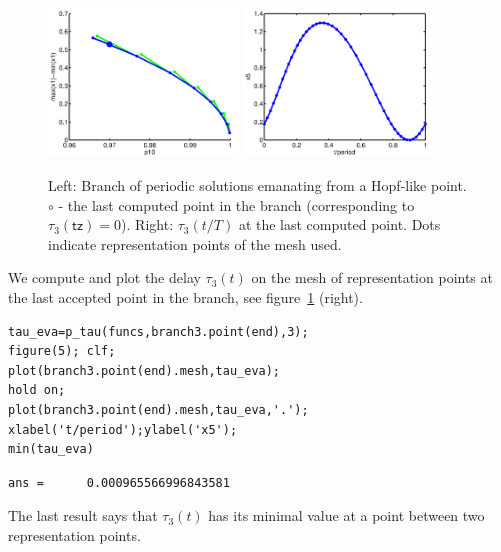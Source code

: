 \documentclass[10pt]{scrartcl}
\newcommand{\parm}[1]{\mathsf{#1}}
\begin{document}
\begin{figure}[h]
  \begin{center}
    \includegraphics[width=0.45\textwidth]{fig/sdd4}
    \includegraphics[width=0.45\textwidth]{fig/sdd5}
  \end{center}
  \caption{\label{br_ps_sd1}Left: Branch of periodic solutions emanating
    from a Hopf-like point. $\circ$ - the last computed point in the branch
    (corresponding to $\tau_3(\parm{tz})=0$). Right: $\tau_3(t/T)$ at 
    the last computed point. Dots indicate representation points
    of the mesh used.}
\end{figure}
We compute and plot the delay $\tau_3(t)$ on the mesh of representation points
at the last accepted point in the
branch, see figure~\ref{br_ps_sd1} (right).
\begin{lstlisting}
tau_eva=p_tau(funcs,branch3.point(end),3);
figure(5); clf;
plot(branch3.point(end).mesh,tau_eva);
hold on;
plot(branch3.point(end).mesh,tau_eva,'.');
xlabel('t/period');ylabel('x5');
min(tau_eva)  
\end{lstlisting}
{\small
\begin{verbatim} 
ans =      0.000965566996843581
\end{verbatim}}
\noindent
The last result says that $\tau_3(t)$  has its minimal value 
at a point between two representation points.
\end{document}
